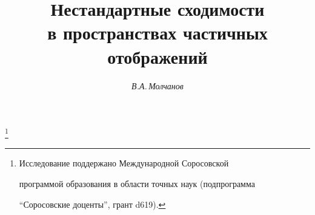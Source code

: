









\newcommand{\imm}{\operatorname{im}}


\newcommand{\dom}{\operatorname{dom}}


\newcommand{\mir}{\overset{-1}{\rho}{}}


\newcommand{\mis}{\overset{-1}{\sigma}{}}


\newcommand{\mih}{\overset{-1}{h}{}}


\newcommand{\mif}{\overset{-1}{f}{}}


\newcommand{\tts}[1]{}










\setcounter{page}{28}












\author{\it В.А.\,Молчанов}




\title{Нестандартные сходимости\\


в пространствах частичных отображений}





\thanks{Исследование поддержано Международной Соросовской


программой образования в области точных наук (подпрограмма


``Соросовские доценты'', грант d619).}


